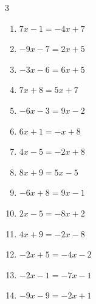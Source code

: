 \begin{multicols}{3}
\begin{enumerate}

  \item $7x-1=-4x+7$


  \item $-9x-7=2x+5$


  \item $-3x-6=6x+5$


  \item $7x+8=5x+7$


  \item $-6x-3=9x-2$


  \item $6x+1=-x+8$

        \phantom{$\displaystyle x=1$}

  \item $4x-5=-2x+8$


  \item $8x+9=5x-5$


  \item $-6x+8=9x-1$


  \item $2x-5=-8x+2$


  \item $4x+9=-2x-8$


  \item $-2x+5=-4x-2$


  \item $-2x-1=-7x-1$

        \phantom{$\displaystyle x=0$}

  \item $-9x-9=-2x+1$


\end{enumerate}
\end{multicols}
